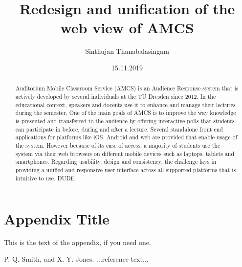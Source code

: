 \documentclass[ngerman]{tudscrreprt}
\begin{document}
	\date{15.11.2019}
	\author{Sinthujan Thanabalasingam}
	\title{Redesign and unification of the web view of AMCS}
	\maketitle
	
\begin{abstract}
	
Auditorium Mobile Classroom Service (AMCS) is an Audience Response system that is actively developed by several individuals at the TU Dresden since 2012. In the educational context, speakers and docents use it to enhance and manage their lectures during the semester. One of the main goals of AMCS is to improve the way knowledge is presented and transferred to the audience by offering interactive polls that students can participate in before, during and after a lecture.
Several standalone front end applications for platforms like iOS, Android and web are provided that enable usage of the system. However because of its ease of access, a majority of students use the system via their web browsers on different mobile devices such as laptops, tablets and smartphones. 
Regarding usability, design and consistency, the challenge lays in providing a unified and responsive user interface across all supported platforms that is intuitive to use. DUDE
	
\end{abstract}









\appendix
\section{Appendix Title}

This is the text of the appendix, if you need one.






\begin{thebibliography}{}
	
	P. Q. Smith, and X. Y. Jones. ...reference text...
	
\end{thebibliography}
\end{document}
